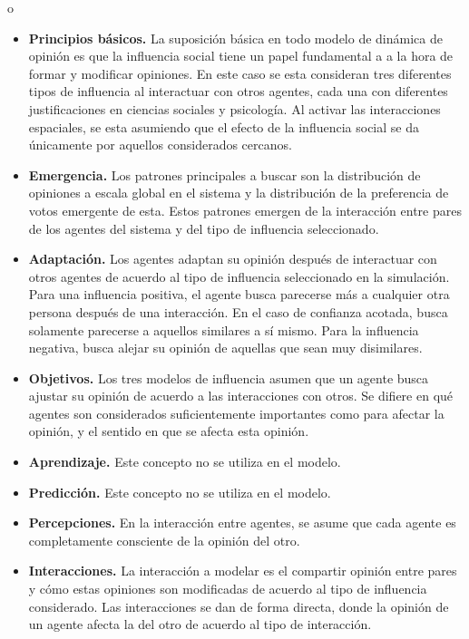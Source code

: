 o \documentclass[11pt, letterpaper]{article}
\begin{document}
\begin{itemize}
\item
  \textbf{Principios básicos.} La suposición básica en todo modelo de
  dinámica de opinión es que la influencia social tiene un papel
  fundamental a a la hora de formar y modificar opiniones. En este caso
  se esta consideran tres diferentes tipos de influencia al interactuar
  con otros agentes, cada una con diferentes justificaciones en ciencias
  sociales y psicología. Al activar las interacciones espaciales, se
  esta asumiendo que el efecto de la influencia social se da únicamente
  por aquellos considerados cercanos.
\item
  \textbf{Emergencia.} Los patrones principales a buscar son la
  distribución de opiniones a escala global en el sistema y la
  distribución de la preferencia de votos emergente de esta. Estos
  patrones emergen de la interacción entre pares de los agentes del
  sistema y del tipo de influencia seleccionado.
\item
  \textbf{Adaptación.} Los agentes adaptan su opinión después de
  interactuar con otros agentes de acuerdo al tipo de influencia
  seleccionado en la simulación. Para una influencia positiva, el agente
  busca parecerse más a cualquier otra persona después de una
  interacción. En el caso de confianza acotada, busca solamente
  parecerse a aquellos similares a sí mismo. Para la influencia
  negativa, busca alejar su opinión de aquellas que sean muy
  disimilares.
\item
  \textbf{Objetivos.} Los tres modelos de influencia asumen que un
  agente busca ajustar su opinión de acuerdo a las interacciones con
  otros. Se difiere en qué agentes son considerados suficientemente
  importantes como para afectar la opinión, y el sentido en que se
  afecta esta opinión.
\item
  \textbf{Aprendizaje.} Este concepto no se utiliza en el modelo.
\item
  \textbf{Predicción.} Este concepto no se utiliza en el modelo.
\item
  \textbf{Percepciones.} En la interacción entre agentes, se asume que
  cada agente es completamente consciente de la opinión del otro.
\item
  \textbf{Interacciones.} La interacción a modelar es el compartir
  opinión entre pares y cómo estas opiniones son modificadas de acuerdo
  al tipo de influencia considerado. Las interacciones se dan de forma
  directa, donde la opinión de un agente afecta la del otro de acuerdo
  al tipo de interacción.

\end{itemize}
\end{document}
